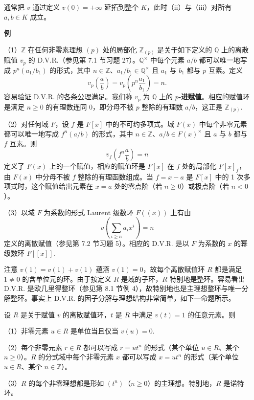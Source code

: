 通常把 \(v\) 通过定义 \(v(0) = +\infty\) 延拓到整个 \(K\)，此时（ii）与（iii）对所有 \(a, b \in K\) 成立。

\noindent\textbf{例}

（1）\(\mathbb{Z}\) 在任何非零素理想 \((p)\) 处的局部化 \(\mathbb{Z}_{(p)}\) 是关于如下定义的 \(\mathbb{Q}\) 上的离散赋值 \(v_p\) 的 D.V.R.（参见第 7.1 节习题 27）。\(\mathbb{Q}^\times\) 中每个元素 \(a/b\) 都可以唯一地写成 \(p^n(a_1/b_1)\) 的形式，其中 \(n \in \mathbb{Z}\)、\(a_1/b_1 \in \mathbb{Q}^\times\) 且 \(a_1\) 与 \(b_1\) 都与 \(p\) 互素。定义
\[
v_p\left(\frac{a}{b}\right) = v_p\left(p^n\frac{a_1}{b_1}\right) = n.
\]
容易验证 D.V.R. 的各条公理满足。我们称 \(v_p\) 为 \(\mathbb{Q}\) 上的 \textbf{\(p\)-进赋值}。相应的赋值环是满足 \(n \geq 0\) 的有理数连同 0，即分母不被 \(p\) 整除的有理数 \(a/b\)，这正是 \(\mathbb{Z}_{(p)}\).

（2）对任何域 \(F\)，设 \(f\) 是 \(F[x]\) 中的不可约多项式。域 \(F(x)\) 中每个非零元素都可以唯一地写成 \(f^n(a/b)\) 的形式，其中 \(n \in \mathbb{Z}\)、\(a/b \in F(x)^\times\) 且 \(a\) 与 \(b\) 都与 \(f\) 互素。则
\[
v_f\left(f^n\frac{a}{b}\right) = n
\]
定义了 \(F(x)\) 上的一个赋值，相应的赋值环是 \(F[x]\) 在 \(f\) 处的局部化 \(F[x]_f\)，由 \(F(x)\) 中分母不被 \(f\) 整除的有理函数组成。当 \(f = x-a\) 是 \(F[x]\) 中的 1 次多项式时，这个赋值给出元素在 \(x = a\) 处的零点阶（若 \(n \geq 0\)）或极点阶（若 \(n < 0\)）。

（3）以域 \(F\) 为系数的形式 Laurent 级数环 \(F((x))\) 上有由
\[
v\left(\sum_{i \geq n}a_ix^i\right) = n
\]
定义的离散赋值（参见第 7.2 节习题 5）。相应的 D.V.R. 是以 \(F\) 为系数的 \(x\) 的幂级数环 \(F[[x]]\).

注意 \(v(1) = v(1)+v(1)\) 蕴涵 \(v(1) = 0\)，故每个离散赋值环 \(R\) 都是满足 \(1 \neq 0\) 的含单位元的环。由于按定义 \(R\) 是域的子环，\(R\) 特别地是整环。容易看出 D.V.R. 是欧几里得整环（参见第 8.1 节例 4），故特别地也是主理想整环与唯一分解整环。事实上 D.V.R. 的因子分解与理想结构非常简单，如下一命题所示。

\begin{proposition}\label{pro:16.5}
设 \(R\) 是关于赋值 \(v\) 的离散赋值环，\(t\) 是 \(R\) 中满足 \(v(t) = 1\) 的任意元素。则

（1）非零元素 \(u \in R\) 是单位当且仅当 \(v(u) = 0\).

（2）每个非零元素 \(r \in R\) 都可以写成 \(r = ut^n\) 的形式（某个单位 \(u \in R\)、某个 \(n \geq 0\)）。\(R\) 的分式域中每个非零元素 \(x\) 都可以写成 \(x = ut^n\) 的形式（某个单位 \(u \in R\)、某个 \(n \in \mathbb{Z}\)）。

（3）\(R\) 的每个非零理想都是形如 \((t^n)\)（\(n \geq 0\)）的主理想。特别地，\(R\) 是诺特环。
\end{proposition}


